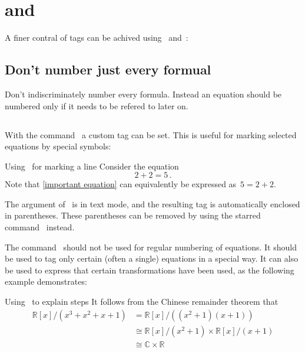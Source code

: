 \section{\texorpdfstring{}{{\tbs}tag} and \texorpdfstring{}{{\tbs}notag}}

A finer contral of tags can be achived using~ and~:





\subsection{Don’t number just every formual}
\label{dont number all formulas}

Don’t indiscriminately number every formula.
Instead an equation should be numbered only if it needs to be refered to later on.



\subsection{\texorpdfstring{}{{\tbs}tag}}

With the command~ a custom tag can be set.
This is useful for marking selected equations by special symbols:
\begin{showlatex}{Using~ for marking a line}
Consider the equation
\begin{equation}
\label{important equation}
  2 + 2 = 5 \,.
  \tag{\ast}
\end{equation}
Note that \cref{important equation} can equivalently be expressed as~$5 = 2 + 2$.
\end{showlatex}
The argument of~ is in text mode, and the resulting tag is automatically enclosed in parentheses.
These parentheses can be removed by using the starred command~ instead.

The command~ should not be used for regular numbering of equations.
It should be used to tag only certain (often a single) equations in a special way.
It can also be used to express that certain transformations have been used, as the following example demonstrates:
\begin{showlatex}{Using~ to explain steps}
It follows from the Chinese remainder theorem that
\begin{align*}
  \mathbb{R}[x] / ( x^3 + x^2 + x + 1 )
  &=
  \mathbb{R}[x] / ( (x^2 + 1) (x + 1) )
  \\
  &\cong
  \mathbb{R}[x] / ( x^2 + 1 ) \times \mathbb{R}[x] / ( x + 1 )
  \tag{CRT}
  \\
  &\cong
  \mathbb{C} \times \mathbb{R}
\end{align*}
\end{showlatex}



